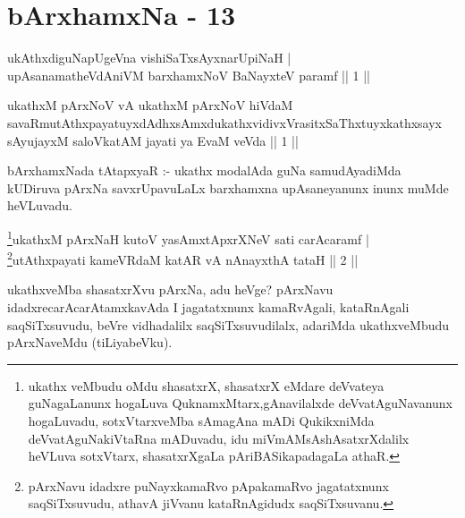 \chapter{bArxhamxNa - 13}

\begin{shl}
ukAthxdiguNapUgeVna vishiSaTxsAyxnarUpiNaH  | \\
upAsanamatheVdAniVM barxhamxNoV BaNayxteV paramf \hfill ||  1 || 
\end{shl}
\vskip 5pt
\begin{kandikeshl}
ukathxM pArxNoV vA ukathxM pArxNoV hiVdaM savaRmutAthxpa\-\break yatuyxdAdhxsAmxdukathxvidivxVrasitxSaThxtuyxkathxsayx sAyujayxM saloVkatAM jayati ya EvaM veVda || 1 ||
\end{kandikeshl}
\vskip 5pt
\begin{artha}
bArxhamxNada tAtapxyaR :- ukathx modalAda guNa samudAyadiMda kUDiruva pArxNa savxrUpavuLaLx barxhamxna upAsaneyanunx inunx muMde heVLuvadu.
\end{artha}
\vskip 5pt
\vskip 5pt
\begin{shl}
\footnote{ukathx veMbudu oMdu shasatxrX, shasatxrX eMdare deVvateya guNagaLanunx hogaLuva QuknamxMtarx,\break gAnavilalxde deVvatAguNavanunx hogaLuvadu, sotxVtarxveMba sAmagAna mADi QukikxniMda deVvatA\-\break guNakiVtaRna mADuvadu, idu miVmAMsAshAsatxrXdalilx heVLuva sotxVtarx, shasatxrXgaLa pAriBASika\break padagaLa athaR.}ukathxM pArxNaH kutoV yasAmxtApxrXNeV sati carAcaramf | \\
\footnote{pArxNavu idadxre puNayxkamaRvo pApakamaRvo jagatatxnunx saqSiTxsuvudu, athavA jiVvanu kataRnAgidudx saqSiTxsuvanu.}utAthxpayati kameVRdaM katAR vA nAnayxthA tataH \hfill ||  2 || 
\end{shl}
\vskip 5pt
\begin{artha}
ukathxveMba shasatxrXvu pArxNa, adu heVge? pArxNavu idadxre\break carAcarAtamxkavAda I jagatatxnunx kamaRvAgali, kataRnAgali saqSiTxsuvudu, beVre vidhadalilx saqSiTxsuvudilalx, adariMda ukathxveMbudu pArxNaveMdu (tiLiyabeVku).
\end{artha}
